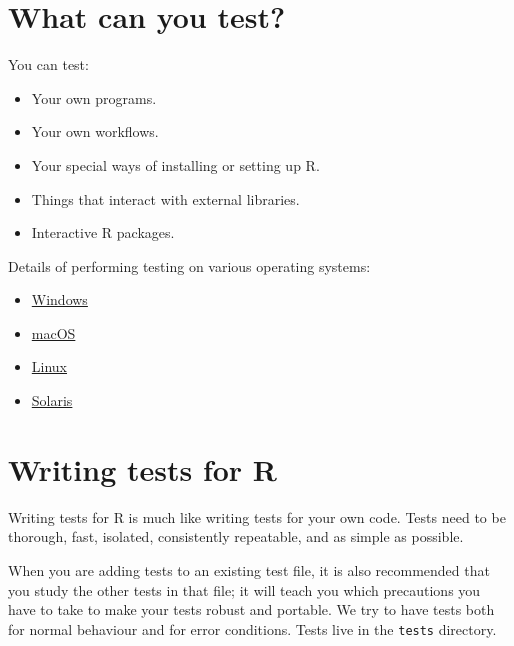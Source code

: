 \documentclass[
]{book}
\begin{document}
\section{What can you test?}\label{what-can-you-test}

You can test:

\begin{itemize}
\item
  Your own programs.
\item
  Your own workflows.
\item
  Your special ways of installing or setting up R.
\item
  Things that interact with external libraries.
\item
  Interactive R packages.
\end{itemize}

Details of performing testing on various operating systems:

\begin{itemize}
\item
  \href{https://blog.r-project.org/2021/04/28/r-can-use-your-help-testing-r-before-release/index.html\#on-windows}{Windows}
\item
  \href{https://blog.r-project.org/2021/04/28/r-can-use-your-help-testing-r-before-release/index.html\#on-macos}{macOS}
\item
  \href{https://blog.r-project.org/2021/04/28/r-can-use-your-help-testing-r-before-release/index.html\#on-linux}{Linux}
\item
  \href{https://blog.r-project.org/2021/04/28/r-can-use-your-help-testing-r-before-release/index.html\#on-solaris}{Solaris}
\end{itemize}

\section{Writing tests for R}\label{writing-tests-for-r}

Writing tests for R is much like writing tests for your own code. Tests need to be thorough, fast, isolated, consistently repeatable, and as simple as possible.

When you are adding tests to an existing test file, it is also recommended that you study the other tests in that file; it will teach you which precautions you have to take to make your tests robust and portable. We try to have tests both for normal behaviour and for error conditions. Tests live in the \texttt{tests} directory.
\end{document}
